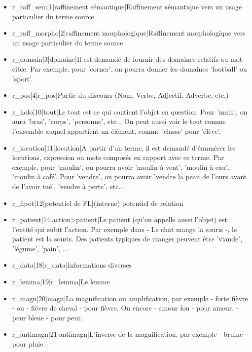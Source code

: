 \documentclass[a4paper,11pt,french]{article}
\begin{document}
\begin{itemize}
\item r\_raff\_sem|1|raffinement sémantique|Raffinement sémantique vers un usage particulier du terme source

\item r\_raff\_morpho|2|raffinement morphologique|Raffinement morphologique vers un usage particulier du terme source

\item r\_domain|3|domaine|Il est demandé de fournir des domaines relatifs au mot cible. Par exemple, pour 'corner', on pourra donner les domaines 'football' ou 'sport'.

\item r\_pos|4|r\_pos|Partie du discours (Nom, Verbe, Adjectif, Adverbe, etc.)

\item r\_holo|10|tout|Le tout est ce qui contient l'objet en question. Pour 'main', on aura 'bras', 'corps', 'personne', etc... On peut aussi voir le tout comme l'ensemble auquel appartient un élément, comme 'classe' pour 'élève'.

\item r\_locution|11|locution|A partir d'un terme, il est demandé d'énumérer les locutions, expression ou mots composés en rapport avec ce terme. Par exemple, pour 'moulin', ou pourra avoir 'moulin à vent', 'moulin à eau', 'moulin à café'. Pour 'vendre', on pourra avoir 'vendre la peau de l'ours avant de l'avoir tué', 'vendre à perte', etc..

\item r\_flpot|12|potentiel de FL|(interne) potentiel de relation

\item r\_patient|14|action>patient|Le patient (qu'on appelle aussi l'objet) est l'entité qui subit l'action. Par exemple dans - Le chat mange la souris -, le patient est la souris. Des patients typiques de manger peuvent être 'viande', 'légume', 'pain', ...

\item r\_data|18|r\_data|Informations diverses

\item r\_lemma|19|r\_lemma|Le lemme

\item r\_magn|20|magn|La magnification ou amplification, par exemple - forte fièvre - ou - fièvre de cheval - pour fièvre. Ou encore - amour fou - pour amour, - peur bleue - pour peur.

\item r\_antimagn|21|antimagn|L'inverse de la magnification, par exemple - bruine - pour pluie.


\end{itemize}
\end{document}
